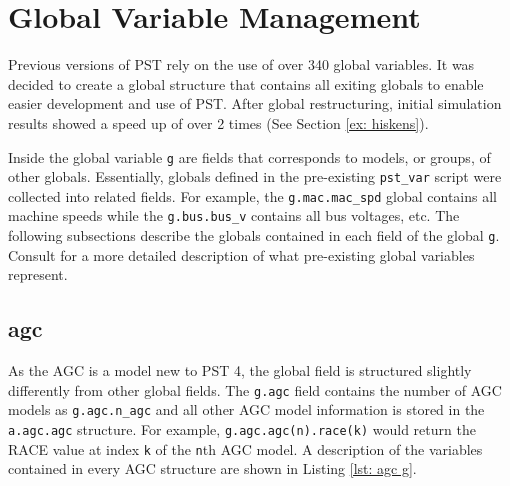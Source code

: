 \pagebreak
\section{Global Variable Management}  
Previous versions of PST rely on the use of over 340 global variables.
It was decided to create a global structure that contains all exiting globals to enable easier development and use of PST.
After global restructuring, initial simulation results showed a speed up of over 2 times (See Section \ref{ex: hiskens}).


Inside the global variable \verb|g| are fields that corresponds to models, or groups, of other globals.
Essentially, globals defined in the pre-existing \verb|pst_var| script were collected into related fields.
For example, the \verb|g.mac.mac_spd| global contains all machine speeds while the \verb|g.bus.bus_v| contains all bus voltages, etc.
The following subsections describe the globals contained in each field of the global \verb|g|. 
Consult \cite{PST3manual} for a more detailed description of what pre-existing global variables represent.


\subsection{agc}  
As the AGC is a model new to PST 4, the global field is structured slightly differently from other global fields.
The \verb|g.agc| field contains the number of AGC models as \verb|g.agc.n_agc| and all other AGC model information is stored in the \verb|a.agc.agc| structure.
For example, \verb|g.agc.agc(n).race(k)| would return the RACE value at index \verb|k| of the \verb|n|th AGC model.
A description of the variables contained in every AGC structure are shown in Listing \ref{lst: agc g}.

